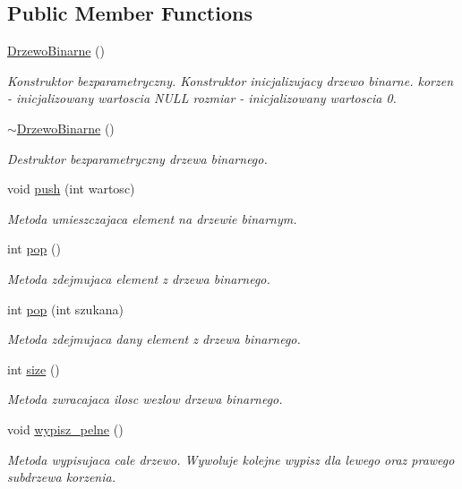 \subsection*{Public Member Functions}
\begin{DoxyCompactItemize}
\item 
\hyperlink{a00010_af183332d7213658b0195009a1c704eff}{Drzewo\+Binarne} ()
\begin{DoxyCompactList}\small\item\em Konstruktor bezparametryczny. Konstruktor inicjalizujacy drzewo binarne. korzen -\/ inicjalizowany wartoscia N\+U\+L\+L rozmiar -\/ inicjalizowany wartoscia 0. \end{DoxyCompactList}\item 
\hyperlink{a00010_a96837c0047f031752358a8fac5d382c8}{$\sim$\+Drzewo\+Binarne} ()
\begin{DoxyCompactList}\small\item\em Destruktor bezparametryczny drzewa binarnego. \end{DoxyCompactList}\item 
void \hyperlink{a00010_a27e1ad6ea3bc41fd20ea4872eda9c0c8}{push} (int wartosc)
\begin{DoxyCompactList}\small\item\em Metoda umieszczajaca element na drzewie binarnym. \end{DoxyCompactList}\item 
int \hyperlink{a00010_acb33dc2ed364228201775243115b6775}{pop} ()
\begin{DoxyCompactList}\small\item\em Metoda zdejmujaca element z drzewa binarnego. \end{DoxyCompactList}\item 
int \hyperlink{a00010_a0ea25934177dc7e7b3f106e3c99cdc45}{pop} (int szukana)
\begin{DoxyCompactList}\small\item\em Metoda zdejmujaca dany element z drzewa binarnego. \end{DoxyCompactList}\item 
int \hyperlink{a00010_ad78ae72a8c225221bee6c59973424676}{size} ()
\begin{DoxyCompactList}\small\item\em Metoda zwracajaca ilosc wezlow drzewa binarnego. \end{DoxyCompactList}\item 
void \hyperlink{a00010_a1693745e223f9e3f69d3fb166380b68a}{wypisz\+\_\+pelne} ()
\begin{DoxyCompactList}\small\item\em Metoda wypisujaca cale drzewo. Wywoluje kolejne wypisz dla lewego oraz prawego subdrzewa korzenia. \end{DoxyCompactList}\item 

\end{DoxyCompactItemize}
